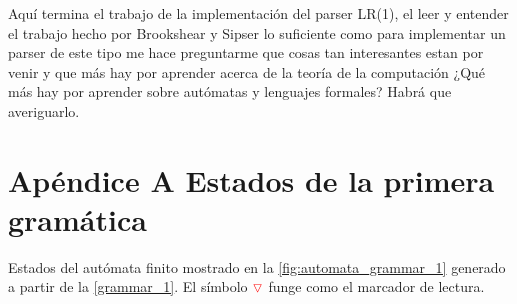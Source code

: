 Aquí termina el trabajo de la implementación del parser LR(1), el leer y entender el trabajo hecho por Brookshear y Sipser \cite{brookshear1989theory,sipser2021introduction} lo suficiente como para implementar un parser de este tipo me hace preguntarme que cosas tan interesantes estan por venir y que más hay por aprender acerca de la teoría de la computación ¿Qué más hay por aprender sobre autómatas y lenguajes formales? Habrá que averiguarlo.

\clearpage
\section*{Apéndice A\hspace{0.5cm} Estados de la primera gramática}

Estados del autómata finito mostrado en la \cref{fig:automata_grammar_1} generado a partir de la \cref{grammar_1}. El símbolo $\marker$ funge como el marcador de lectura.
\vspace{1cm}

